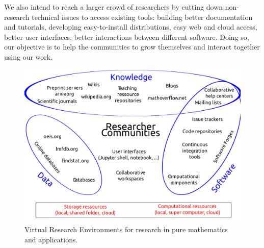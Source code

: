 \documentclass[a4paper,11pt]{article}
\begin{document}
We also intend to reach a larger crowd of researchers by cutting down non-research technical issues to access existing tools: building better documentation and tutorials, developing easy-to-install distributions, easy web and cloud access, better user interfaces, better interactions between different software. Doing so, our objective is to help the communities to grow themselves and interact together using our work. 


\clearpage

\begin{figure}
  \centerline{\includegraphics[width=\textwidth]{Pictures/TheBigPicture.pdf}}
  \caption{Virtual Research Environments for research in pure
    mathematics and applications.}
  \label{fig:thebigpicture}
\end{figure}

\end{document}
